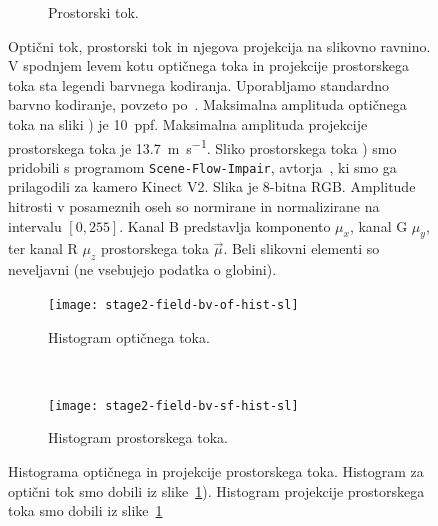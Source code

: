 \begin{figure}[!htb]
\begin{subfigure}[t]{0.3\columnwidth}
		\caption{Prostorski tok.}
	\end{subfigure}
	\caption[Optični tok, prostorski tok in njegova projekcija]{Optični tok, prostorski tok in njegova projekcija na slikovno ravnino. V spodnjem levem kotu optičnega toka in projekcije prostorskega toka sta legendi barvnega kodiranja. Uporabljamo standardno barvno kodiranje, povzeto po~\cite{baker2011database}. Maksimalna amplituda optičnega toka na sliki  ) je  \SI{10}{ppf}. Maksimalna amplituda projekcije prostorskega toka je \SI{13.7}{\m\per\s}. Sliko prostorskega toka ) smo pridobili s programom \texttt{Scene-Flow-Impair}, avtorja~\cite{jaimez2015primal}, ki smo ga prilagodili za kamero Kinect V2. Slika je 8-bitna RGB. Amplitude hitrosti v posameznih oseh so normirane in normalizirane na intervalu $[0,255]$. Kanal B predstavlja komponento $\mu_x$, kanal G $\mu_y$, ter kanal R $\mu_z$ prostorskega toka $\vec{\mu}$. Beli slikovni elementi so neveljavni (ne vsebujejo podatka o globini).}
	\label{fig:stage2-field-sfof}
\end{figure}



\begin{figure}[!htb]
	\centering
	\begin{subfigure}[t]{0.45\columnwidth}
		\texttt{[image: stage2-field-bv-of-hist-sl]}
		\caption{Histogram optičnega toka.}
	\end{subfigure}
	~
	\begin{subfigure}[t]{0.45\columnwidth}
		\texttt{[image: stage2-field-bv-sf-hist-sl]}
		\caption{Histogram prostorskega toka.}
	\end{subfigure}
	\caption[Histograma optičnega in projekcije prostorskega toka]{Histograma optičnega in projekcije prostorskega toka. Histogram za optični tok smo dobili iz slike~\ref{fig:stage2-field-sfof}). Histogram projekcije prostorskega toka smo dobili iz slike~\ref{fig:stage2-field-sfof}}
	\label{fig:stage2-field-hist}
\end{figure}


